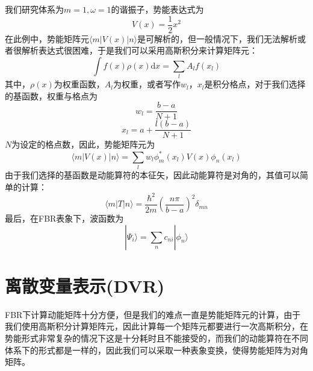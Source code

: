 \documentclass[]{article}
\begin{document}
我们研究体系为$m=1, \omega=1$的谐振子，势能表达式为
\begin{equation}
	V(x)=\dfrac{1}{2}x^2
\end{equation}
在此例中，势能矩阵元$\langle m|V(x)|n\rangle$是可解析的，但一般情况下，我们无法解析或者很解析表达式很困难，于是我们可以采用高斯积分来计算矩阵元：
\begin{equation}
	\int f(x)\rho(x)\mathrm{d}x=\sum\limits_lA_lf(x_l)
\end{equation}
其中，$\rho(x)$为权重函数，$A_l$为权重，或者写作$w_l$，$x_l$是积分格点，对于我们选择的基函数，权重与格点为
\begin{equation}
	w_l=\dfrac{b-a}{N+1}
\end{equation}
\begin{equation}
	x_l=a+\dfrac{l(b-a)}{N+1}
\end{equation}
$N$为设定的格点数，因此，势能矩阵元为
\begin{equation}
	\langle m|V(x)|n\rangle=\sum\limits_lw_l\phi_m^*(x_l)V(x)\phi_n(x_l)
\end{equation}
由于我们选择的基函数是动能算符的本征矢，因此动能算符是对角的，其值可以简单的计算：
\begin{equation}
	\langle m|T|n\rangle=\dfrac{\hbar^2}{2m}\left( \dfrac{n\pi}{b-a}\right)^2\delta_{mn} 
\end{equation}
最后，在FBR表象下，波函数为
\begin{equation}
	|\Psi_i\rangle=\sum\limits_nc_{ni}|\phi_n\rangle
\end{equation}
\section{离散变量表示(DVR)}
FBR下计算动能矩阵十分方便，但是我们的难点一直是势能矩阵元的计算，由于我们使用高斯积分计算矩阵元，因此计算每一个矩阵元都要进行一次高斯积分，在势能形式非常复杂的情况下这是十分耗时且不能接受的，而我们的动能算符在不同体系下的形式都是一样的，因此我们可以采取一种表象变换，使得势能矩阵为对角矩阵。
\end{document}
